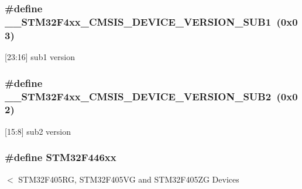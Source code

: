 \subsubsection[{\texorpdfstring{\+\_\+\+\_\+\+S\+T\+M32\+F4xx\+\_\+\+C\+M\+S\+I\+S\+\_\+\+D\+E\+V\+I\+C\+E\+\_\+\+V\+E\+R\+S\+I\+O\+N\+\_\+\+S\+U\+B1}{__STM32F4xx_CMSIS_DEVICE_VERSION_SUB1}}]{\setlength{\rightskip}{0pt plus 5cm}\#define \+\_\+\+\_\+\+S\+T\+M32\+F4xx\+\_\+\+C\+M\+S\+I\+S\+\_\+\+D\+E\+V\+I\+C\+E\+\_\+\+V\+E\+R\+S\+I\+O\+N\+\_\+\+S\+U\+B1~(0x03)}\hypertarget{group___library__configuration__section_gaa840ca8cc59044a45c604b95c546666b}{}\label{group___library__configuration__section_gaa840ca8cc59044a45c604b95c546666b}
\mbox{[}23\+:16\mbox{]} sub1 version 
\subsubsection[{\texorpdfstring{\+\_\+\+\_\+\+S\+T\+M32\+F4xx\+\_\+\+C\+M\+S\+I\+S\+\_\+\+D\+E\+V\+I\+C\+E\+\_\+\+V\+E\+R\+S\+I\+O\+N\+\_\+\+S\+U\+B2}{__STM32F4xx_CMSIS_DEVICE_VERSION_SUB2}}]{\setlength{\rightskip}{0pt plus 5cm}\#define \+\_\+\+\_\+\+S\+T\+M32\+F4xx\+\_\+\+C\+M\+S\+I\+S\+\_\+\+D\+E\+V\+I\+C\+E\+\_\+\+V\+E\+R\+S\+I\+O\+N\+\_\+\+S\+U\+B2~(0x02)}\hypertarget{group___library__configuration__section_ga5697f6bbcd478565105f00c06dc97a96}{}\label{group___library__configuration__section_ga5697f6bbcd478565105f00c06dc97a96}
\mbox{[}15\+:8\mbox{]} sub2 version 
\subsubsection[{\texorpdfstring{S\+T\+M32\+F446xx}{STM32F446xx}}]{\setlength{\rightskip}{0pt plus 5cm}\#define S\+T\+M32\+F446xx}\hypertarget{group___library__configuration__section_ga89c3f6e33fc5056c1c5c4b09463458da}{}\label{group___library__configuration__section_ga89c3f6e33fc5056c1c5c4b09463458da}
$<$ S\+T\+M32\+F405\+RG, S\+T\+M32\+F405\+VG and S\+T\+M32\+F405\+ZG Devices

